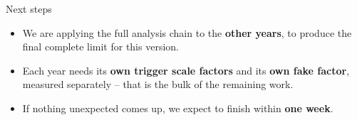 \documentclass[aspectratio=169,10pt]{beamer}
\begin{document}
\begin{frame}{Next steps}
  \small
  \begin{itemize}
    \item We are applying the full analysis chain to the \textbf{other years},
      to produce the final complete limit for this version.
    \item Each year needs its \textbf{own trigger scale factors} and its
      \textbf{own fake factor}, measured separately -- that is the bulk of the
      remaining work.
    \item If nothing unexpected comes up, we expect to finish within
      \textbf{one week}.
  \end{itemize}
\end{frame}
\end{document}
